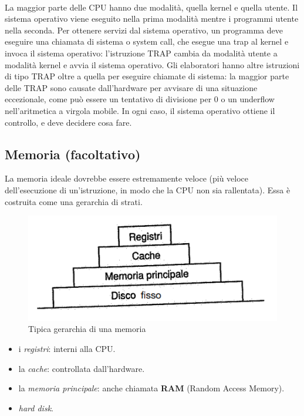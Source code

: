 \paragraph*{}
La maggior parte delle CPU hanno due modalità, quella kernel e quella utente.
Il sistema operativo viene eseguito nella prima modalità mentre i programmi utente nella seconda. Per ottenere servizi dal sistema operativo, un programma deve eseguire una chiamata di sistema o system call, che esegue una trap al kernel e invoca il sistema operativo: l'istruzione TRAP cambia da modalità utente a modalità kernel e avvia il sistema operativo.
Gli elaboratori hanno altre istruzioni di tipo TRAP oltre a quella per eseguire chiamate di sistema: la maggior parte delle TRAP sono causate dall'hardware per avvisare di una situazione eccezionale, come può essere un tentativo di divisione per 0 o un underflow nell'aritmetica a virgola mobile. In ogni caso, il sistema operativo ottiene il controllo, e deve decidere cosa fare.

\subsection{Memoria (facoltativo)}
La memoria ideale dovrebbe essere estremamente veloce (più veloce dell'esecuzione di un'istruzione, in modo che la CPU non sia rallentata).
Essa è costruita come una gerarchia di strati.

\begin{figure}
\includegraphics[width=1\linewidth]{assets/memoria1.png} 
\caption{Tipica gerarchia di una memoria}
\end{figure}

\phantom{ }
\begin{itemize}
    \item i \textit{registri}: interni alla CPU.
    \item la \textit{cache}: controllata dall'hardware.
    \item la \textit{memoria principale}: anche chiamata \textbf{RAM} (Random Access Memory).
    \item \textit{hard disk}.
\end{itemize}


